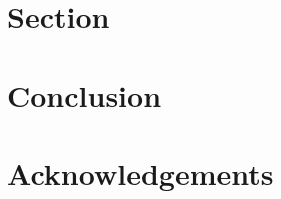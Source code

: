 \documentclass[conference]{IEEEtran}
\begin{document}
\section{Section}
\label{sec:3}



\section{Conclusion}
\label{sec:conclusion}



\section*{Acknowledgements}
\label{sec:ack}





\end{document}

